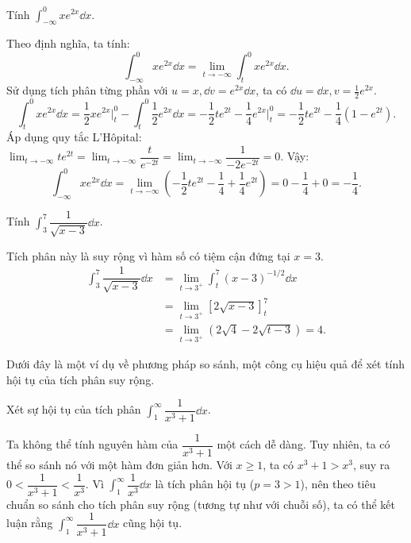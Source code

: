 \begin{example}
    Tính $\int_{-\infty}^0 x e^{2x} \dd x$.
\end{example}
\begin{solution}
    Theo định nghĩa, ta tính:
    \[
        \int_{-\infty}^0 x e^{2x} \dd x = \lim_{t \to -\infty} \int_t^0 x e^{2x} \dd x.
    \]
    Sử dụng tích phân từng phần với $u=x, \dd v = e^{2x}\dd x$, ta có $\dd u = \dd x, v = \frac{1}{2}e^{2x}$.
    \[
        \int_t^0 x e^{2x} \dd x = \dfrac{1}{2}xe^{2x} \bigg|_t^0 - \int_t^0 \dfrac{1}{2}e^{2x} \dd x = -\dfrac{1}{2}te^{2t} - \dfrac{1}{4}e^{2x} \bigg|_t^0 = -\dfrac{1}{2}te^{2t} - \dfrac{1}{4}(1 - e^{2t}).
    \]
    Áp dụng quy tắc L'Hôpital: $\lim_{t \to -\infty} te^{2t} = \lim_{t \to -\infty} \dfrac{t}{e^{-2t}} = \lim_{t \to -\infty} \dfrac{1}{-2e^{-2t}} = 0$.
    Vậy:
    \[
        \int_{-\infty}^0 x e^{2x} \dd x = \lim_{t \to -\infty} \left(-\dfrac{1}{2}te^{2t} - \dfrac{1}{4} + \dfrac{1}{4}e^{2t}\right) = 0 - \dfrac{1}{4} + 0 = -\dfrac{1}{4}.
    \]
\end{solution}

\begin{example}
    Tính $\int_3^7 \dfrac{1}{\sqrt{x-3}} \dd x$.
\end{example}
\begin{solution}
    Tích phân này là suy rộng vì hàm số có tiệm cận đứng tại $x=3$.
    \begin{align*}
        \int_3^7 \dfrac{1}{\sqrt{x-3}} \dd x &= \lim_{t \to 3^+} \int_t^7 (x-3)^{-1/2} \dd x \\
        &= \lim_{t \to 3^+} \left[ 2\sqrt{x-3} \right]_t^7 \\
        &= \lim_{t \to 3^+} (2\sqrt{4} - 2\sqrt{t-3}) = 4.
    \end{align*}
\end{solution}

Dưới đây là một ví dụ về phương pháp so sánh, một công cụ hiệu quả để xét tính hội tụ của tích phân suy rộng.

\begin{example}
    Xét sự hội tụ của tích phân $\int_1^\infty \dfrac{1}{x^3+1} \dd x$.
\end{example}
\begin{solution}
    Ta không thể tính nguyên hàm của $\dfrac{1}{x^3+1}$ một cách dễ dàng. Tuy nhiên, ta có thể so sánh nó với một hàm đơn giản hơn.
    Với $x \ge 1$, ta có $x^3+1 > x^3$, suy ra $0 < \dfrac{1}{x^3+1} < \dfrac{1}{x^3}$.
    Vì $\int_1^\infty \dfrac{1}{x^3} \dd x$ là tích phân hội tụ ($p=3 > 1$), nên theo tiêu chuẩn so sánh cho tích phân suy rộng (tương tự như với chuỗi số), ta có thể kết luận rằng $\int_1^\infty \dfrac{1}{x^3+1} \dd x$ cũng hội tụ.
\end{solution}

